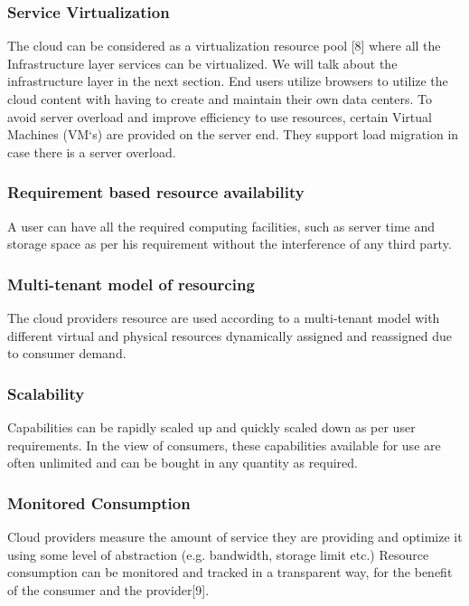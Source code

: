 \documentclass[10pt, conference, compsocconf]{IEEEtran}
\begin{document}
\subsubsection{Service Virtualization}
The cloud can be considered as a virtualization resource pool [8] where all the Infrastructure layer services can be virtualized. We will talk about the infrastructure layer in the next section. End users utilize browsers to utilize the cloud content with having to create and maintain their own data centers. To avoid server overload and improve efficiency to use resources, certain Virtual Machines (VM`s) are provided on the server end. They support load migration in case there is a server overload.
\subsubsection{Requirement based resource availability}
A user can have all the required computing facilities, such as server time and storage space as per his requirement without the interference of any third party.
\subsubsection{Multi-tenant model of resourcing}
The cloud providers resource are used according to a multi-tenant model with different virtual and physical resources dynamically assigned and reassigned due to consumer demand.
\subsubsection{Scalability}
Capabilities can be rapidly scaled up and quickly scaled down as per user requirements. In the view of consumers, these capabilities available for use are often unlimited and can be bought in any quantity as required.
\subsubsection{Monitored Consumption}
Cloud providers measure the amount of service they are providing and optimize it using some level of abstraction (e.g. bandwidth, storage limit etc.) Resource consumption can be monitored and tracked in a transparent way, for the benefit of the consumer and the provider[9].
\end{document}
